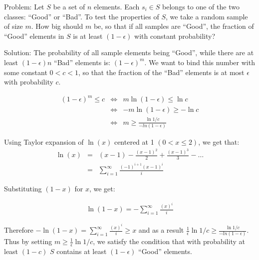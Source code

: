 \documentclass{article}
\begin{document}
Problem: Let $S$ be a set of $n$ elements. Each $s_i \in S$ belongs to
one of the two classes: ``Good'' or ``Bad''. To test the properties
of $S$, we take a random sample of size $m$. How big should $m$ be, so
that if all samples are ``Good'', the fraction of 
``Good''  elements in $S$ is at least $(1-\epsilon)$ with
constant probability?

Solution: The probability of all sample elements being ``Good'', while
there are at least $(1-\epsilon)n$ ``Bad'' elements is:
$(1-\epsilon)^{m}$. We want to bind this number with some constant
$0 < c < 1$, so that the fraction of the ``Bad'' elements is at most
$\epsilon$ with probability $c$.

\begin{eqnarray*}
(1-\epsilon)^{m} \leq c &\Leftrightarrow& m\ln{(1-\epsilon)} \leq \ln{c}\\
&\Leftrightarrow& -m\ln{(1-\epsilon)} \geq -\ln{c}\\
&\Leftrightarrow& m \geq \frac{\ln{1/c}}{-ln{(1-\epsilon)}}  
\end{eqnarray*}

Using Taylor expansion of $\ln{(x)}$ centered at 1 $( 0 < x \leq 2)$, we get that:
\begin{eqnarray*}
\ln{(x)} &=& (x-1) - \frac{(x-1)^2}{2} + \frac{(x-1)^{3}}{3} - \ldots \\
&=& \sum_{i=1}^{\infty} \frac{(-1)^{i+1}(x-1)^{i}}{i}
\end{eqnarray*}

Substituting $(1-x)$ for $x$, we get:

\begin{eqnarray*}
\ln{(1-x)} = -\sum_{i=1}^{\infty} \frac{(x)^{i}}{i}
\end{eqnarray*}

Therefore $-\ln{(1-x)} = \sum_{i=1}^{\infty} \frac{(x)^{i}}{i} \geq x$
and as a result $\frac{1}{\epsilon} \ln{1/c} \geq
\frac{\ln{1/c}}{-ln{(1-\epsilon)}}$. Thus by setting $m \geq
\frac{1}{\epsilon} \ln{1/c}$, we satisfy the condition that with
probability at least $(1-c)$ $S$ contains at least $(1-\epsilon)$
``Good'' elements. 
\end{document}

